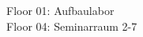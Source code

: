 \documentclass[a4paper]{article}
\begin{document}
\begin{center}
\begin{vsltext}{1.6cm}{2cm}
    Floor 01: Aufbaulabor\\
    Floor 04: Seminarraum 2-7\\
\end{vsltext}

\end{center}
\end{document}
